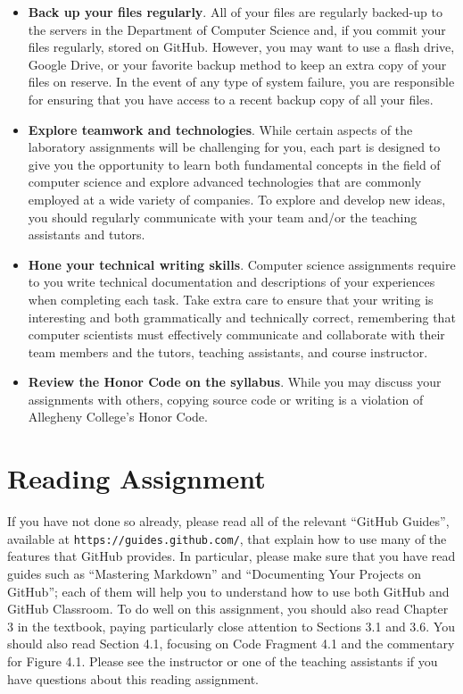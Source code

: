 \documentclass[11pt]{article}
\newcommand{\url}[1]{\lstinline{#1}}
\begin{document}
\begin{itemize}
\item {\bf Back up your files regularly}. All of your files are regularly backed-up to the servers in the Department of
  Computer Science and, if you commit your files regularly, stored on GitHub. However, you may want to use a flash
  drive, Google Drive, or your favorite backup method to keep an extra copy of your files on reserve. In the event of
  any type of system failure, you are responsible for ensuring that you have access to a recent backup copy of all your
  files.

\item {\bf Explore teamwork and technologies}. While certain aspects of the laboratory assignments will be challenging
  for you, each part is designed to give you the opportunity to learn both fundamental concepts in the field of computer
  science and explore advanced technologies that are commonly employed at a wide variety of companies. To explore and
  develop new ideas, you should regularly communicate with your team and/or the teaching assistants and tutors.

\item {\bf Hone your technical writing skills}. Computer science assignments require to you write technical
  documentation and descriptions of your experiences when completing each task. Take extra care to ensure that your
  writing is interesting and both grammatically and technically correct, remembering that computer scientists must
  effectively communicate and collaborate with their team members and the tutors, teaching assistants, and course
  instructor.

\item {\bf Review the Honor Code on the syllabus}. While you may discuss your assignments with others, copying source
  code or writing is a violation of Allegheny College's Honor Code.

\end{itemize}

\section*{Reading Assignment}

If you have not done so already, please read all of the relevant ``GitHub
Guides'', available at \url{https://guides.github.com/}, that explain how to use
many of the features that GitHub provides. In particular, please make sure that
you have read guides such as ``Mastering Markdown'' and ``Documenting Your
Projects on GitHub''; each of them will help you to understand how to use both
GitHub and GitHub Classroom. To do well on this assignment, you should also read
Chapter 3 in the textbook, paying particularly close attention to Sections 3.1
and 3.6. You should also read Section 4.1, focusing on Code Fragment 4.1 and the
commentary for Figure 4.1. Please see the instructor or one of the teaching
assistants if you have questions about this reading assignment.
\end{document}
